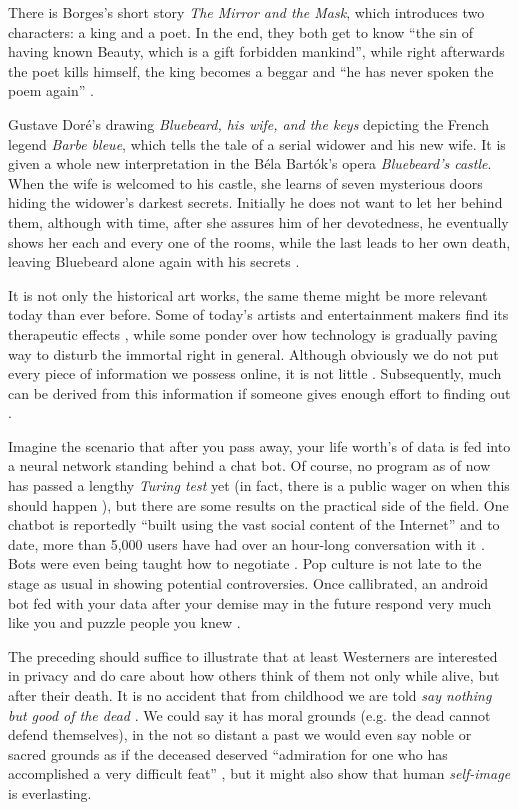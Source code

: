 \documentclass[a4paper]{article}
\begin{document}
There is Borges's short story \textit{The Mirror and the Mask}, which introduces two characters: a king and a poet. In the end, they both get to know ``the sin of having known Beauty, which is a gift forbidden mankind'', while right afterwards the poet kills himself, the king becomes a beggar and ``he has never spoken the poem again'' \cite{borges}. 

Gustave Doré's drawing \textit{Bluebeard, his wife, and the keys} \cite{dore} depicting the French legend \textit{Barbe bleue}, which tells the tale of a serial widower and his new wife. It is given a whole new interpretation in the Béla Bartók's opera \textit{Bluebeard's castle}. 
When the wife is welcomed to his castle, she learns of seven mysterious doors hiding the widower's darkest secrets. 
Initially he does not want to let her behind them, although with time, after she assures him of her devotedness, he eventually shows her each and every one of the rooms, while the last leads to her own death, leaving Bluebeard alone again with his secrets \cite{keiser}.

It is not only the historical art works, the same theme might be more relevant today than ever before. Some of today's artists and entertainment makers find its therapeutic effects \cite{sophie-calle}, while some ponder over how technology is gradually paving way to disturb the immortal right in general. 
Although obviously we do not put every piece of information we possess online, it is not little \cite{marr}. Subsequently, much can be derived from this information if someone gives enough effort to finding out \cite{like, datascience}.

Imagine the scenario that after you pass away, your life worth's of data is fed into a neural network standing behind a chat bot. Of course, no program as of now has passed a lengthy \textit{Turing test} yet (in fact, there is a public wager on when this should happen \cite{longbet}), but there are some results on the practical side of the field. 
One chatbot is reportedly ``built using the vast social content of the Internet'' and to date, more than 5,000 users have had over an hour-long conversation with it \cite{microsoft}. Bots were even being taught how to negotiate \cite{fbbots}. 
Pop culture is not late to the stage as usual in showing potential controversies. Once callibrated, an android bot fed with your data after your demise may in the future respond very much like you and puzzle people you knew \cite{blackmirror}.

\medskip
The preceding should suffice to illustrate that at least Westerners are interested in privacy and do care about how others think of them not only while alive, but after their death. It is no accident that from childhood we are told \textit{say nothing but good of the dead} \cite{collins}. 
We could say it has moral grounds (e.g. the dead cannot defend themselves), in the not so distant a past we would even say noble or sacred grounds as if the deceased deserved ``admiration for one who has accomplished a very difficult feat'' \cite{freud}, but it might also show that human \emph{self-image} is everlasting.
\end{document}
